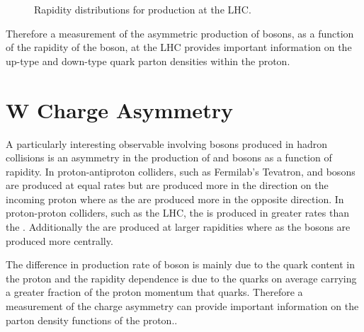 \begin{figure}[htb]
  \centering
  \caption{Rapidity distributions for \PWpm production at the LHC.}
  \label{wbos:wrapid}
\end{figure}

Therefore a measurement of the asymmetric production of \PW bosons, as a
function of the rapidity of the boson, at the \ac{LHC} provides important
information on the up-type and down-type quark parton densities within the
proton. 





\section{W Charge Asymmetry}

A particularly interesting observable involving \PW bosons produced in hadron
collisions is an asymmetry in the production of \PWp and \PWm bosons as a
function of rapidity.
In proton-antiproton colliders, such as Fermilab's Tevatron,  \PWp and \PWm
bosons are produced at equal rates but \PWp are produced more in the direction
on the incoming proton where as the \PWm are produced more in the opposite
direction.
In proton-proton colliders, such as the LHC, the \PWp is produced in greater
rates than the \PWm. Additionally the \PWp are produced at larger rapidities
where as the \PWm bosons are produced more centrally. \cite{phenom}

The difference in production rate of \PWpm boson is mainly due to the quark
content in the proton and the rapidity dependence is due to the \Pup quarks on
average carrying a greater fraction of the proton momentum that \Pdown quarks.
Therefore a measurement of the charge asymmetry can provide important
information on the parton density functions of the proton.\cite{phenom,pdf}.

